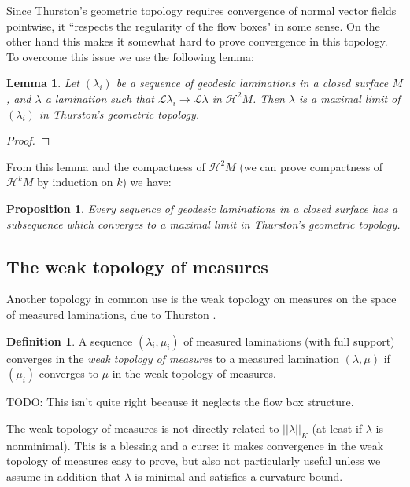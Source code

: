 \documentclass[reqno,10pt]{amsart}
\newcommand{\Leaves}{\mathscr L}
\newcommand{\Hypspace}{\mathscr H}
\newcommand{\dfn}[1]{\emph{#1}\index{#1}}
\newtheorem{lemma}[theorem]{Lemma}
\newtheorem{proposition}[theorem]{Proposition}
\theoremstyle{definition}
\newtheorem{definition}[theorem]{Definition}
\numberwithin{equation}{section}
\begin{document}
Since Thurston's geometric topology requires convergence of normal vector fields pointwise, it ``respects the regularity of the flow boxes" in some sense.
On the other hand this makes it somewhat hard to prove convergence in this topology.
To overcome this issue we use the following lemma:

\begin{lemma}
Let $(\lambda_i)$ be a sequence of geodesic laminations in a closed surface $M$, and $\lambda$ a lamination such that $\Leaves \lambda_i \to \Leaves \lambda$ in $\Hypspace^2 M$.
Then $\lambda$ is a maximal limit of $(\lambda_i)$ in Thurston's geometric topology.
\end{lemma}
\begin{proof}

\end{proof}

From this lemma and the compactness of $\Hypspace^2 M$ (we can prove compactness of $\Hypspace^k M$ by induction on $k$) we have:

\begin{proposition}
Every sequence of geodesic laminations in a closed surface has a subsequence which converges to a maximal limit in Thurston's geometric topology.
\end{proposition}


\subsection{The weak topology of measures}
Another topology in common use is the weak topology on measures on the space of measured laminations, due to Thurston \cite[Chapter 8]{thurston1998minimal}.

\begin{definition}
A sequence $(\lambda_i, \mu_i)$ of measured laminations (with full support) converges in the \dfn{weak topology of measures} to a measured lamination $(\lambda, \mu)$ if $(\mu_i)$ converges to $\mu$ in the weak topology of measures.
\end{definition}

TODO: This isn't quite right because it neglects the flow box structure.

The weak topology of measures is not directly related to $||\lambda||_K$ (at least if $\lambda$ is nonminimal).
This is a blessing and a curse: it makes convergence in the weak topology of measures easy to prove, but also not particularly useful unless we assume in addition that $\lambda$ is minimal and satisfies a curvature bound.
\end{document}
